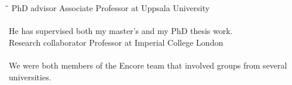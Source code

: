 \begin{tabbing}
  \hspace{4cm}\=\hspace{4cm}\=\kill
   \> PhD advisor \> Associate Professor at Uppsala University\\[1mm]
  \\[1mm]
  He has supervised both my master's and my PhD thesis work.\\[5mm]
   \> Research collaborator \> Professor at Imperial College London\\[1mm]
  \\[1mm]
  We were both members of the Encore team that involved groups from several
  universities.
\end{tabbing}